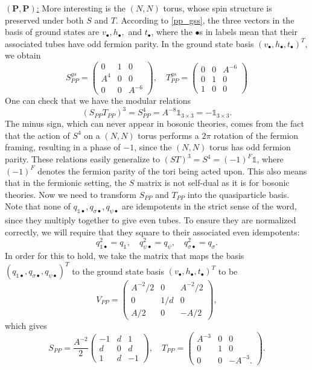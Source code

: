 \documentclass[12pt,a4paper]{article}
\newcommand{\unit}{\mathds{1}}
\newcommand\be            {\begin{equation}}
\newcommand\ee            {\end{equation}}
\begin{document}
\underline{$\mathbf{(P,P)}$:} More interesting is the $(N,N)$ torus, whose spin structure is preserved under both $S$ and $T$. According to \eqref{pp_gss}, the three vectors in the basis of ground states are $v_\bullet,h_\bullet,$ and $t_\bullet$,
where the $\bullet$s in labels mean that their associated tubes have odd fermion parity.
In the ground state basis $(v_\bullet,h_\bullet,t_\bullet)^T$, we obtain
\be S^{gs}_{PP} = \begin{pmatrix}0 & 1 & 0 \\ A^4 & 0 & 0 \\ 0 & 0 & A^{-6} \end{pmatrix},\quad T^{gs}_{PP} = \begin{pmatrix} 0 & 0 & A^{-6} \\ 0 & 1 & 0 \\ 1 & 0 & 0 \end{pmatrix}\ee
One can check that we have the modular relations
\be (S_{PP}T_{PP})^3 = S_{PP}^4= A^{-8}\unit_{3\times3} = -\unit_{3\times 3}.\ee 
The minus sign, which can never appear in bosonic theories, comes from the fact that the action of $S^4$ on a $(N,N)$ torus performs a $2\pi$ rotation of the fermion framing, resulting in a phase of $-1$, since the $(N,N)$ torus has odd fermion parity. 
These relations easily generalize to $(ST)^3=S^4=(-1)^F\unit$, where $(-1)^F$ denotes the fermion parity of the tori being acted upon.
This also means that in the fermionic setting, the $S$ matrix is not self-dual as it is for bosonic theories. 
Now we need to transform $S_{PP}$ and $T_{PP}$ into the quasiparticle basis. 
Note that none of $q_{\unit\bullet},q_{\sigma\bullet},q_{\psi\bullet}$ are idempotents in the strict sense of the word, since they multiply together to give even tubes. 
To ensure they are normalized correctly, we will require that they square to their associated even idempotents:
\be q_{\unit\bullet}^2 = q_\unit,\quad q_{\psi\bullet}^2 = q_\psi,\quad q_{\sigma\bullet}^2 = q_\sigma.\ee
In order for this to hold, we
take the matrix that maps the basis $(q_{\unit\bullet},q_{\sigma\bullet},q_{\psi\bullet})^T$ to the ground state basis $(v_\bullet,h_\bullet,t_\bullet)^T$ to be 
\be V_{PP} = \begin{pmatrix} A^{-2}/2 & 0 & A^{-2}/2 \\ 0 & 1/d & 0 \\ A/2 & 0 & -A/2 \end{pmatrix},\ee
which gives 
\be S_{PP} = \frac{A^{-2}}{2} \begin{pmatrix} -1 & d & 1 \\ d & 0 & d \\ 1 & d & -1 \end{pmatrix},\quad T_{PP} = \begin{pmatrix} A^{-3} & 0 & 0 \\ 0 & 1 & 0 \\ 0& 0& -A^{-3}.\end{pmatrix}.\ee
\end{document}
